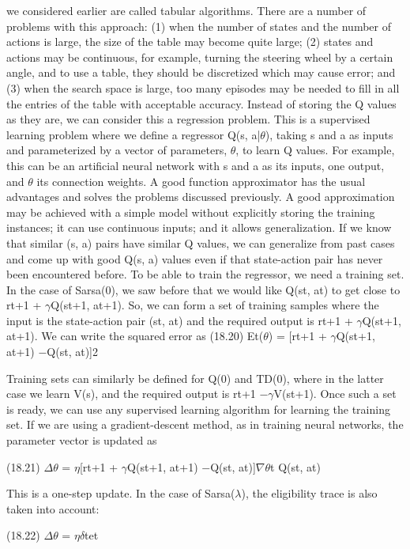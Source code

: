 we considered earlier are called tabular algorithms. There are a number of problems with this approach: (1) when the number of states and the number of actions is large, the size of the table may become quite large; (2) states and actions may be continuous, for example, turning the steering wheel by a certain angle, and to use a table, they should be discretized which may cause error; and (3) when the search space is large, too many episodes may be needed to fill in all the entries of the table with acceptable accuracy. Instead of storing the Q values as they are, we can consider this a regression problem. This is a supervised learning problem where we define a regressor Q(s, a|$\theta$), taking s and a as inputs and parameterized by a vector of parameters, $\theta$, to learn Q values. For example, this can be an artificial neural network with s and a as its inputs, one output, and $\theta$ its connection weights. A good function approximator has the usual advantages and solves the problems discussed previously. A good approximation may be achieved with a simple model without explicitly storing the training instances; it can use continuous inputs; and it allows generalization. If we know that similar (s, a) pairs have similar Q values, we can generalize from past cases and come up with good Q(s, a) values even if that state-action pair has never been encountered before. To be able to train the regressor, we need a training set. In the case of Sarsa(0), we saw before that we would like Q(st, at) to get close to rt+1 + $\gamma$Q(st+1, at+1). So, we can form a set of training samples where the input is the state-action pair (st, at) and the required output is rt+1 + $\gamma$Q(st+1, at+1). We can write the squared error as (18.20) Et($\theta$) = [rt+1 + $\gamma$Q(st+1, at+1) $-$Q(st, at)]2

Training sets can similarly be defined for Q(0) and TD(0), where in the latter case we learn V(s), and the required output is rt+1 $-$$\gamma$V(st+1). Once such a set is ready, we can use any supervised learning algorithm for learning the training set. If we are using a gradient-descent method, as in training neural networks, the parameter vector is updated as

(18.21) $\Delta$$\theta$ = $\eta$[rt+1 + $\gamma$Q(st+1, at+1) $-$Q(st, at)]$\nabla$$\theta$t Q(st, at)

This is a one-step update. In the case of Sarsa($\lambda$), the eligibility trace is also taken into account:

(18.22) $\Delta$$\theta$ = $\eta$$\delta$tet

